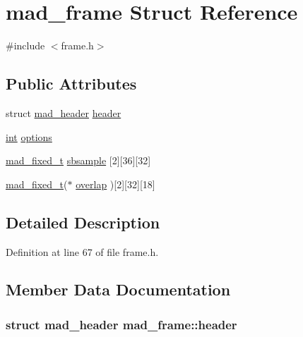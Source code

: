 \hypertarget{structmad__frame}{}\section{mad\+\_\+frame Struct Reference}
\label{structmad__frame}


{\ttfamily \#include $<$frame.\+h$>$}

\subsection*{Public Attributes}
\begin{DoxyCompactItemize}
\item 
struct \hyperlink{structmad__header}{mad\+\_\+header} \hyperlink{structmad__frame_a65c2d01fcd43fefff994d61c55433307}{header}
\item 
\hyperlink{xmltok_8h_a5a0d4a5641ce434f1d23533f2b2e6653}{int} \hyperlink{structmad__frame_a9a7cdd4253810f2ec5ff5bace7144e53}{options}
\item 
\hyperlink{libmad_2fixed_8h_a8a4b50d6d4d6827b7a8c871db1cbfd78}{mad\+\_\+fixed\+\_\+t} \hyperlink{structmad__frame_a9c70d94f445671d5d7cf09bbbc9cbfef}{sbsample} \mbox{[}2\mbox{]}\mbox{[}36\mbox{]}\mbox{[}32\mbox{]}
\item 
\hyperlink{libmad_2fixed_8h_a8a4b50d6d4d6827b7a8c871db1cbfd78}{mad\+\_\+fixed\+\_\+t}($\ast$ \hyperlink{structmad__frame_afc8e2e262968a482023531799e2c8d2e}{overlap} )\mbox{[}2\mbox{]}\mbox{[}32\mbox{]}\mbox{[}18\mbox{]}
\end{DoxyCompactItemize}


\subsection{Detailed Description}


Definition at line 67 of file frame.\+h.



\subsection{Member Data Documentation}
\subsubsection[{\texorpdfstring{header}{header}}]{\setlength{\rightskip}{0pt plus 5cm}struct {\bf mad\+\_\+header} mad\+\_\+frame\+::header}\hypertarget{structmad__frame_a65c2d01fcd43fefff994d61c55433307}{}\label{structmad__frame_a65c2d01fcd43fefff994d61c55433307}


